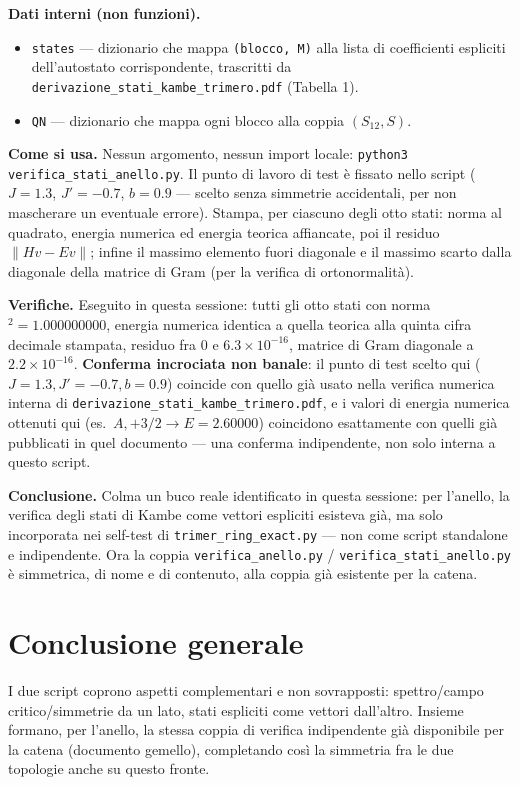 \documentclass[11pt,a4paper]{article}
\begin{document}
\textbf{Dati interni (non funzioni).}
\begin{itemize}
\item \texttt{states} — dizionario che mappa \texttt{(blocco, M)} alla lista di
coefficienti espliciti dell'autostato corrispondente, trascritti da
\texttt{derivazione\_stati\_kambe\_trimero.pdf} (Tabella 1).
\item \texttt{QN} — dizionario che mappa ogni blocco alla coppia $(S_{12},S)$.
\end{itemize}

\textbf{Come si usa.} Nessun argomento, nessun import locale: \texttt{python3
verifica\_stati\_anello.py}. Il punto di lavoro di test è fissato nello script
($J=1.3$, $J'=-0.7$, $b=0.9$ — scelto senza simmetrie accidentali, per non mascherare
un eventuale errore). Stampa, per ciascuno degli otto stati: norma al quadrato,
energia numerica ed energia teorica affiancate, poi il residuo $\|Hv-Ev\|$; infine il
massimo elemento fuori diagonale e il massimo scarto dalla diagonale della matrice di
Gram (per la verifica di ortonormalità).

\textbf{Verifiche.} Eseguito in questa sessione: tutti gli otto stati con norma
$^2=1.000000000$, energia numerica identica a quella teorica alla quinta cifra
decimale stampata, residuo fra $0$ e $6.3\times10^{-16}$, matrice di Gram diagonale
a $2.2\times10^{-16}$. \textbf{Conferma incrociata non banale}: il punto di test
scelto qui ($J{=}1.3,J'{=}-0.7,b{=}0.9$) coincide con quello già usato nella
verifica numerica interna di \texttt{derivazione\_stati\_kambe\_trimero.pdf}, e i
valori di energia numerica ottenuti qui (es.\ $A,+3/2\to E=2.60000$) coincidono
esattamente con quelli già pubblicati in quel documento — una conferma indipendente,
non solo interna a questo script.

\textbf{Conclusione.} Colma un buco reale identificato in questa sessione: per
l'anello, la verifica degli stati di Kambe come vettori espliciti esisteva già, ma
solo incorporata nei self-test di \texttt{trimer\_ring\_exact.py} — non come script
standalone e indipendente. Ora la coppia \texttt{verifica\_anello.py} /
\texttt{verifica\_stati\_anello.py} è simmetrica, di nome e di contenuto, alla coppia
già esistente per la catena.

\section*{Conclusione generale}

I due script coprono aspetti complementari e non sovrapposti: spettro/campo
critico/simmetrie da un lato, stati espliciti come vettori dall'altro. Insieme
formano, per l'anello, la stessa coppia di verifica indipendente già disponibile per
la catena (documento gemello), completando così la simmetria fra le due topologie
anche su questo fronte.
\end{document}

